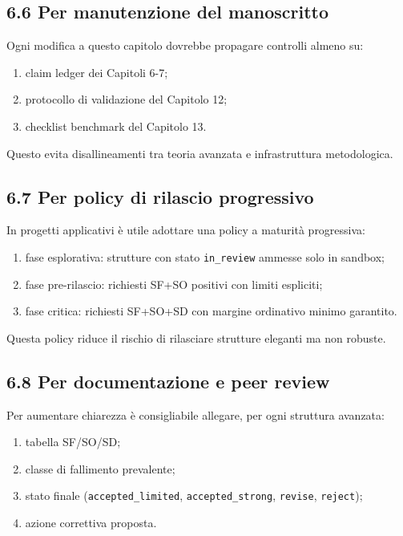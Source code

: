 \subsection{6.6 Per manutenzione del manoscritto}

Ogni modifica a questo capitolo dovrebbe propagare controlli almeno su:

\begin{enumerate}
\def\labelenumi{\arabic{enumi}.}
\tightlist
\item
  claim ledger dei Capitoli 6-7;
\item
  protocollo di validazione del Capitolo 12;
\item
  checklist benchmark del Capitolo 13.
\end{enumerate}

Questo evita disallineamenti tra teoria avanzata e infrastruttura metodologica.

\subsection{6.7 Per policy di rilascio progressivo}

In progetti applicativi è utile adottare una policy a maturità progressiva:

\begin{enumerate}
\def\labelenumi{\arabic{enumi}.}
\tightlist
\item
  fase esplorativa: strutture con stato \texttt{in\_review} ammesse solo in sandbox;
\item
  fase pre-rilascio: richiesti SF+SO positivi con limiti espliciti;
\item
  fase critica: richiesti SF+SO+SD con margine ordinativo minimo garantito.
\end{enumerate}

Questa policy riduce il rischio di rilasciare strutture eleganti ma non robuste.

\subsection{6.8 Per documentazione e peer review}

Per aumentare chiarezza è consigliabile allegare, per ogni struttura avanzata:

\begin{enumerate}
\def\labelenumi{\arabic{enumi}.}
\tightlist
\item
  tabella SF/SO/SD;
\item
  classe di fallimento prevalente;
\item
  stato finale (\texttt{accepted\_limited}, \texttt{accepted\_strong}, \texttt{revise}, \texttt{reject});
\item
  azione correttiva proposta.
\end{enumerate}

